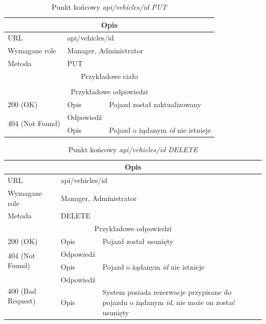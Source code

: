 \documentclass[eng,printmode,openany]{mgr}
\begin{document}
\begin{table}[H]
	\caption{Punkt końcowy \textit{api/vehicles/id PUT}}
	\begin{tabularx}{\textwidth}{|l|l|X|}
		\hline
		\multicolumn{3}{|c|}{Opis}                         							\\ \hline
		URL                       & \multicolumn{2}{l|}{api/vehicles/id} 			\\ \hline
		Wymagane role             & \multicolumn{2}{l|}{Manager, Administrator} 	\\ \hline		
		Metoda                    & \multicolumn{2}{l|}{PUT} 						\\ \hline
		\multicolumn{3}{|c|}{Przykładowe ciało}         							\\ \hline
		\multicolumn{3}{|c|}{} 										\\ \hline
		\multicolumn{3}{|c|}{Przykładowe odpowiedzi}                   															\\ \hline
		200 (OK)			& Opis         	& Pojazd został zaktualizowany 														\\ \hline
		\multirow{2}{*}{404 (Not Found)} 	& Odpowiedź 	&      \\ \cline{2-3} 
		& Opis          & Pojazd o żądanym \textit{id} nie istnieje  										\\ \hline
	\end{tabularx}
\end{table}

\begin{table}[H]
	\caption{Punkt końcowy \textit{api/vehicles/id DELETE}}
	\begin{tabularx}{\textwidth}{|l|l|X|}
		\hline
		\multicolumn{3}{|c|}{Opis}                         						\\ \hline
		URL                       & \multicolumn{2}{l|}{api/vehicles/id} 		\\ \hline
		Wymagane role             & \multicolumn{2}{l|}{Manager, Administrator} \\ \hline
		Metoda                    & \multicolumn{2}{l|}{DELETE} 				\\ \hline
		\multicolumn{3}{|c|}{ Przykładowe odpowiedzi}                   		\\ \hline
		200 (OK)			& Opis         	& Pojazd został usunięty			\\ 	\hline
		\multirow{2}{*}{404 (Not Found)} 	& Odpowiedź     &      	\\ \cline{2-3} 
		& Opis          & Pojazd o żądanym \textit{id} nie istnieje  											\\ \hline
		\multirow{2}{*}{400 (Bad Request)} 	& Odpowiedź     &      	\\ \cline{2-3} 
		& Opis          & System posiada rezerwacje przypisane do pojazdu o żądanym \textit{id}, nie może on zostać usunięty				\\ \hline
	\end{tabularx}
\end{table}
\end{document}
